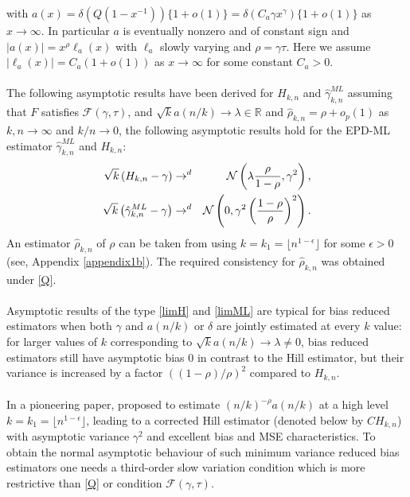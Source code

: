 with $a(x) = \delta (Q(1-x^{-1}))\{1+o(1)\}= \delta (C_a{\gamma} x^{\gamma})\{1+o(1)\}$ as $x \to \infty$. In particular
$a$ is eventually nonzero and of constant sign and $|a(x)|= x^{\rho}\ell_{a}(x)$ with $\ell_a$ slowly varying and $\rho=\gamma\tau$. Here we assume $|\ell_a (x)|= C_a (1+o(1))$ as $x \to \infty$ for some constant $C_a>0$.
\\\\
The following asymptotic results have been derived for $H_{k,n}$ and $\hat{\gamma}^{ML}_{k,n}$ assuming that $F$ satisfies $\mathcal{F}(\gamma,\tau)$, and $\sqrt{k} a(n/k) \to \lambda \in \mathbb{R}$ and $\hat{\rho}_{k,n} = \rho + o_p(1)$ as $k,n \to \infty$ and $k/n \to 0$, the following asymptotic results hold for the EPD-ML estimator $\hat{\gamma}^{ML}_{k,n}$ and $H_{k,n}$:
\begin{eqnarray}
\sqrt{k} \left( H_{k,n}-\gamma \right) & \to^d & 
\mathcal{N}\left(\lambda {\rho \over 1-\rho} , \gamma^2
\right), \label{limH} \\ 
\sqrt{k} \left( \hat{\gamma}^{ML}_{k,n}-\gamma \right) & \to^d & 
\mathcal{N}\left(0, \gamma^2 \left({1-\rho \over \rho} \right)^2
\right).
\label{limML} 
\end{eqnarray}
An estimator $\hat{\rho}_{k,n}$ of $\rho$ can be taken from \cite{alves2003new} using $k=k_1= \lfloor n^{1-\epsilon}\rfloor$ for some $\epsilon >0$ (see, Appendix \ref{appendix1b}). The required consistency for $\hat{\rho}_{k,n}$ was obtained under \eqref{Q}.
\\\\
Asymptotic results of the type \eqref{limH} and \eqref{limML} are typical for bias reduced estimators when both $\gamma$ and $a(n/k)$ or $\delta$ are jointly estimated at every $k$ value:
for larger values of $k$ corresponding to $\sqrt{k} a(n/k) \to \lambda \neq 0$, bias reduced estimators still have asymptotic bias 0 in contrast to the Hill estimator, but their variance is increased by a factor $((1-\rho)/\rho)^2$ compared to $H_{k,n}$.
\\\\
In a pioneering paper, \cite{caeiro2005direct} proposed to estimate $(n/k)^{-\rho} a(n/k)$ at a high level $k=k_1= \lfloor n^{1-\epsilon}\rfloor$, leading to a corrected Hill estimator (denoted below by $CH_{k,n}$) with asymptotic variance $\gamma^2$ and excellent bias and MSE characteristics. To obtain the normal asymptotic behaviour of such minimum variance reduced bias estimators one needs a third-order slow variation condition which is more restrictive than \eqref{Q} or condition $\mathcal{F}(\gamma,\tau)$.  

